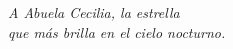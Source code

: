 \newpage
{}
\setcounter{page}{2}

\vspace*{15cm}
\begin{flushright}
\textit{A Abuela Cecilia, la estrella \\que m\'as brilla en el cielo nocturno.}
\end{flushright}




